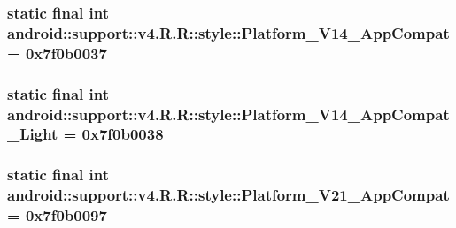 \hypertarget{classandroid_1_1support_1_1v4_1_1_r_1_1style_eca419c6a8ce52bfae1166b8b7ddeb1a}{
\subsubsection[{Platform\_\-V14\_\-AppCompat}]{\setlength{\rightskip}{0pt plus 5cm}static final int android::support::v4.R.R::style::Platform\_\-V14\_\-AppCompat = 0x7f0b0037}}
\label{classandroid_1_1support_1_1v4_1_1_r_1_1style_eca419c6a8ce52bfae1166b8b7ddeb1a}


\hypertarget{classandroid_1_1support_1_1v4_1_1_r_1_1style_2f8d515f3c002b6d794e594075e79c8d}{
\subsubsection[{Platform\_\-V14\_\-AppCompat\_\-Light}]{\setlength{\rightskip}{0pt plus 5cm}static final int android::support::v4.R.R::style::Platform\_\-V14\_\-AppCompat\_\-Light = 0x7f0b0038}}
\label{classandroid_1_1support_1_1v4_1_1_r_1_1style_2f8d515f3c002b6d794e594075e79c8d}


\hypertarget{classandroid_1_1support_1_1v4_1_1_r_1_1style_83b503e2307ed2a2e943932cb5b94932}{
\subsubsection[{Platform\_\-V21\_\-AppCompat}]{\setlength{\rightskip}{0pt plus 5cm}static final int android::support::v4.R.R::style::Platform\_\-V21\_\-AppCompat = 0x7f0b0097}}
\label{classandroid_1_1support_1_1v4_1_1_r_1_1style_83b503e2307ed2a2e943932cb5b94932}


